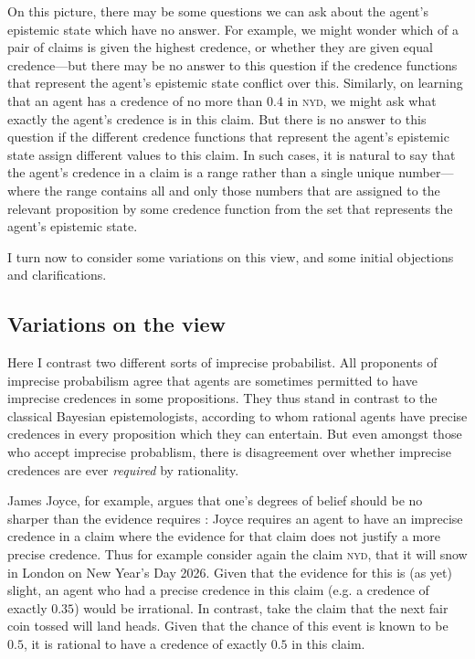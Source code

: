 On this picture, there may be some questions we can ask about the agent's epistemic state which have no answer. For example, we might wonder which of a pair of claims is given the highest credence, or whether they are given equal credence---but there may be no answer to this question if the credence functions that represent the agent's epistemic state conflict over this. Similarly, on learning that an agent has a credence of no more than $0.4$ in \textsc{nyd}, we might ask what exactly the agent's credence is in this claim. But there is no answer to this question if the different credence functions that represent the agent's epistemic state assign different values to this claim. In such cases, it is natural to say that the agent's credence in a claim is a range rather than a single unique number---where the range contains all and only those numbers that are assigned to the relevant proposition by some credence function from the set that represents the agent's epistemic state. 

I turn now to consider some variations on this view, and some initial objections and clarifications.

\subsection{Variations on the view}

Here I contrast two different sorts of imprecise probabilist. All proponents of imprecise probabilism agree that agents are sometimes permitted to have imprecise credences in some propositions. They thus stand in contrast to the classical Bayesian epistemologists, according to whom rational agents have precise credences in every proposition which they can entertain. But even amongst those who accept imprecise probablism, there is disagreement over whether imprecise credences are ever \emph{required} by rationality. 

James Joyce, for example, argues that one's degrees of belief should be no sharper than the evidence requires \citep{joyce2005}: Joyce requires an agent to have an imprecise credence in a claim where the evidence for that claim does not justify a more precise credence. Thus for example consider again the claim \textsc{nyd}, that it will snow in London on New Year's Day 2026. Given that the evidence for this is (as yet) slight, an agent who had a precise credence in this claim (e.g. a credence of exactly $0.35$) would be irrational. In contrast, take the claim that the next fair coin tossed will land heads. Given that the chance of this event is known to be $0.5$, it is rational to have a credence of exactly $0.5$ in this claim. 


